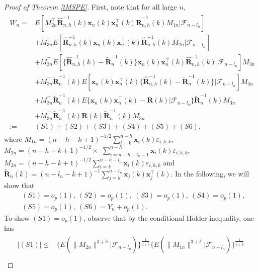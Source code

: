 \documentclass[ejsv2]{imsart}
\theoremstyle{plain}
\theoremstyle{definition}
\theoremstyle{remark}
\begin{document}
\begin{proof}[Proof of Theorem \ref{tMSPE}]
{First,  note that for all large $n$,
\begin{align}\label{ptMSPE.1.1.1}
\begin{split}
    W_n =& E[M_{2n}^\top\hat{\mathbf{R}}_{n,h}^{-1}(k)\mathbf{x}_n(k)\mathbf{x}^\top_n(k)
     \hat{\mathbf{R}}_{n,h}^{-1}(k)M_{1n}|\mathcal{F}_{n-l_n}]\\
     &+M_{3n}^\top E[\hat{\mathbf{R}}_{n,h}^{-1}(k)\mathbf{x}_n(k)\mathbf{x}^\top_n(k)
     \hat{\mathbf{R}}_{n,h}^{-1}(k)M_{2n}|\mathcal{F}_{n-l_n}]\\
     &+M_{3n}^\top E[\{\hat{\mathbf{R}}_{n,h}^{-1}(k)-\tilde{\mathbf{R}}_n^{-1}(k)\}\mathbf{x}_n(k)\mathbf{x}^\top_n(k)
     \hat{\mathbf{R}}_{n,h}^{-1}(k)|\mathcal{F}_{n-l_n}]M_{3n}\\
     &+M_{3n}^\top\tilde{\mathbf{R}}_n^{-1}(k)E[\mathbf{x}_n(k)\mathbf{x}^\top_n(k)
     \{\hat{\mathbf{R}}_{n,h}^{-1}(k)-\tilde{\mathbf{R}}_n^{-1}(k)\}|\mathcal{F}_{n-l_n}]M_{3n}\\
     &+M_{3n}^\top\tilde{\mathbf{R}}_n^{-1}(k)
     E\{\mathbf{x}_n(k)\mathbf{x}^\top_n(k)-\mathbf{R}(k)|\mathcal{F}_{n-l_n}\}\tilde{\mathbf{R}}_n^{-1}(k)M_{3n}\\
     &+M_{3n}^\top\tilde{\mathbf{R}}_n^{-1}(k)\mathbf{R}(k)\tilde{\mathbf{R}}_n^{-1}(k)M_{3n}\\
     :=& (S1)+(S2)+(S3)+(S4)+(S5)+(S6),
\end{split}
\end{align}
where $M_{1n}=(n-h-k+1)^{-1/2}\sum_{i=k}^{n-h}\mathbf{x}_i(k)\varepsilon_{i,h,k}$, $M_{2n}=(n-h-k+1)^{-1/2}\times$
$\sum_{i=n-h-l_n+1}^{n-h}\mathbf{x}_i(k)\varepsilon_{i,h,k}$, $M_{3n}=(n-h-k+1)^{-1/2}\sum_{i=k}^{n-h-l_n}\mathbf{x}_i(k)\varepsilon_{i,h,k}$ and
$\tilde{\mathbf{R}}_n(k)=(n-l_n-k+1)^{-1}\sum_{j=k}^{n-l_n}\mathbf{x}_j(k)\mathbf{x}_j^\top(k)$. In the following, we will show that
\begin{equation}\label{ptMSPE.S1-S6}
\begin{split}
     & (S1)=o_p(1),\ (S2)=o_p(1),\ (S3)=o_p(1),\ (S4)=o_p(1),   \\
     & (S5)=o_p(1),\ (S6)=Y_n+o_p(1).
\end{split}
\end{equation}
To show $(S1)=o_p(1)$, observe that by the conditional H$\ddot{\mathrm{o}}$lder inequality, one has
\begin{align}\label{ptMSPE.1.1.2}
\begin{split}
   |(S1)| \leq & \{E(\lVert M_{2n}\rVert^{3+\tilde{\delta}}|\mathcal{F}_{n-l_n})\}^{\frac{1}{3+\tilde{\delta}}}
    \{E(\lVert M_{1n}\rVert^{3+\tilde{\delta}}|\mathcal{F}_{n-l_n})\}^{\frac{1}{3+\tilde{\delta}}}\\

\end{split}
\end{align}}
\end{proof}
\end{document}
